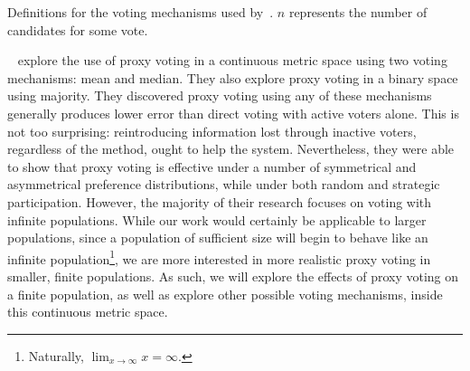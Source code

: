 \begin{table}[htbp]
    \renewcommand{\arraystretch}{1.3}

    \caption{
        Definitions for the voting mechanisms used by~\cite{Mathur2017}.
        $n$ represents the number of candidates for some vote.
    }
    \label{tab:mathur-voting-mechanisms}

    \centering
    
\end{table}
%

~\cite{Cohensius2017} explore the use of proxy voting in a
continuous metric space using two voting mechanisms: mean and median.
They also explore proxy voting in a binary space using majority.
They discovered proxy voting using any of these mechanisms generally produces lower
error than direct voting with active voters alone.
This is not too surprising: reintroducing information lost through inactive voters,
regardless of the method, ought to help the system.
Nevertheless, they were able to show that proxy voting is effective under a number of
symmetrical and asymmetrical preference distributions, while under both random and
strategic participation.
However, the majority of their research focuses on voting with infinite populations.
While our work would certainly be applicable to larger populations, since a
population of sufficient size will begin to behave like an infinite population\footnote{
    Naturally, $\lim_{x \rightarrow \infty} x = \infty$.
}, we are more interested in more realistic proxy voting in smaller, finite populations.
As such, we will explore the effects of proxy voting on a finite population, as well
as explore other possible voting mechanisms, inside this continuous metric space.

